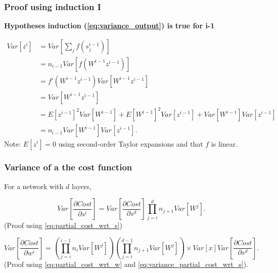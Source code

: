 \begin{frame}
  \frametitle{Proof using induction I}

    \textbf{ Hypotheses induction (\ref{eq:variance_output}) is true for i-1}

    \begin{align}
      Var[z^i] & =  
    Var \left[
      \sum_j f \left( s_j^{i-1} \right)
    \right]
    \\
    & = 
    n_{i - 1} Var \left[
      f \left( W^{i-1} z^{i-1} \right)
    \right]
    \\
    & = 
    f' \left( W^{i-1} z^{i-1} \right)
    Var \left[
      W^{i-1} z^{i-1} 
    \right]
    \\
    & = 
    Var \left[
      W^{i-1} z^{i-1} 
    \right]
    \\
    & = 
    E\left[ z^{i-1}\right]^2
    Var \left[
      W^{i-1} 
    \right]
    + 
    E\left[ W^{i-1} \right]^2
    Var \left[
     z^{i-1} 
    \right]
    + 
    Var \left[
      W^{i-1} 
    \right]
    Var \left[
      z^{i-1} 
    \right]
    \\
    & = 
    n_{i-1}
    Var \left[
      W^{i-1} 
    \right]
    Var \left[
      z^{i-1} 
    \right].
    \end{align}
    {\tiny
    Note: $E\left[ z^{i}\right] = 0$ using second-order Taylor expansions and that $f$ is linear. 
    }

\end{frame}

\begin{frame}
  \frametitle{Variance of a the cost function}

  For a network with $d$ layers, 

  \begin{equation}
    \label{eq:variance_partial_cost_wrt_s}
    Var\left[
      \frac{\partial Cost}{ \partial s^i}
    \right]
    = 
    Var\left[
      \frac{\partial Cost}{ \partial s^d}
    \right]
    \prod_{j = i}^{d} n_{j + 1} 
      Var \left[ W^j\right]. 
  \end{equation}
  (Proof using \ref{eq:partial_cost_wrt_s})

  \begin{equation}
    Var\left[
      \frac{\partial Cost}{ \partial w^i}
    \right]
    = 
    \left(
      \prod_{j = i}^{i - 1} n_{i } 
        Var \left[ W^j\right]
    \right)
    \left(
    \prod_{j = i}^{d - 1} n_{j+1} 
      Var \left[ W^j\right]
    \right)
    \times
    Var[x]
    Var\left[
      \frac{\partial Cost}{ \partial s^d}
    \right].
  \end{equation}
  (Proof using \ref{eq:partial_cost_wrt_w} and
  \ref{eq:variance_partial_cost_wrt_s}).
\end{frame}

